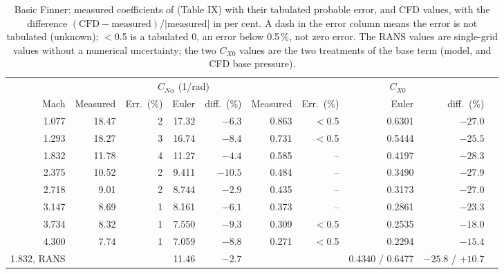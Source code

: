 \documentclass[11pt,a4paper]{article}
\newcommand{\CNa}{C_{N\alpha}}
\newcommand{\CXzero}{C_{X0}}
\begin{document}
\begin{table}[t]
\centering
\caption{Basic Finner: measured coefficients of \citet{dupuis1997} (Table IX) with their tabulated probable error, and CFD values, with the difference
$(\text{CFD}-\text{measured})/|\text{measured}|$ in per cent. A dash in the error column means the error is not tabulated (unknown); $<$0.5 is a tabulated 0,
an error below 0.5\,\%, not zero error. The RANS values are single-grid values without a numerical uncertainty; the two $\CXzero$ values are the
two treatments of the base term (model, and CFD base pressure).}
\label{tab:validation}
\footnotesize
\setlength{\tabcolsep}{4pt}
\begin{tabular}{@{}rrrrrrrrrr@{}}
\toprule
 & \multicolumn{5}{c}{$\CNa$ (1/rad)} & \multicolumn{4}{c}{$\CXzero$} \\
\cmidrule(lr){2-6}\cmidrule(l){7-10}
Mach & Measured & Err.\ (\%) & Euler & diff.\ (\%) & Measured & Err.\ (\%) & Euler & diff.\ (\%) \\
\midrule
1.077 & 18.47 & 2 & 17.32 & $-6.3$ & 0.863 & $<$0.5 & 0.6301 & $-27.0$ \\
1.293 & 18.27 & 3 & 16.74 & $-8.4$ & 0.731 & $<$0.5 & 0.5444 & $-25.5$ \\
1.832 & 11.78 & 4 & 11.27 & $-4.4$ & 0.585 & -- & 0.4197 & $-28.3$ \\
2.375 & 10.52 & 2 & 9.411 & $-10.5$ & 0.484 & -- & 0.3490 & $-27.9$ \\
2.718 & 9.01 & 2 & 8.744 & $-2.9$ & 0.435 & -- & 0.3173 & $-27.0$ \\
3.147 & 8.69 & 1 & 8.161 & $-6.1$ & 0.373 & -- & 0.2861 & $-23.3$ \\
3.734 & 8.32 & 1 & 7.550 & $-9.3$ & 0.309 & $<$0.5 & 0.2535 & $-18.0$ \\
4.300 & 7.74 & 1 & 7.059 & $-8.8$ & 0.271 & $<$0.5 & 0.2294 & $-15.4$ \\
\midrule
1.832, RANS & & & 11.46 & $-2.7$ & & & 0.4340 / 0.6477 & $-25.8$ / $+10.7$ \\
\bottomrule
\end{tabular}
\end{table}
\end{document}
